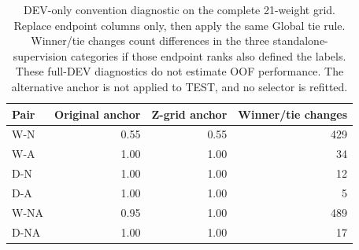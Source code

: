 \begin{table}[htbp]
\centering\footnotesize\setlength{\tabcolsep}{4pt}
\caption{DEV-only convention diagnostic on the complete 21-weight grid. Replace endpoint columns only, then apply the same Global tie rule. Winner/tie changes count differences in the three standalone-supervision categories if those endpoint ranks also defined the labels. These full-DEV diagnostics do not estimate OOF performance. The alternative anchor is not applied to TEST, and no selector is refitted.}
\label{tab:endpoint-anchors}
\begin{tabular}{lrrr}
\toprule
Pair & Original anchor & Z-grid anchor & Winner/tie changes\\
\midrule
W-N & 0.55 & 0.55 & 429\\
W-A & 1.00 & 1.00 & 34\\
D-N & 1.00 & 1.00 & 12\\
D-A & 1.00 & 1.00 & 5\\
W-NA & 0.95 & 1.00 & 489\\
D-NA & 1.00 & 1.00 & 17\\
\bottomrule
\end{tabular}
\end{table}
